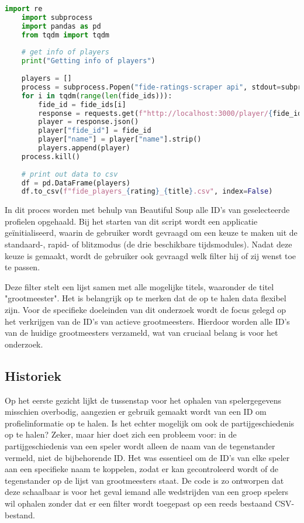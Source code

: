 \begin{lstlisting}[language=Python]
    import re
    import subprocess
    import pandas as pd
    from tqdm import tqdm
    
    # get info of players
    print("Getting info of players")
    
    players = []
    process = subprocess.Popen("fide-ratings-scraper api", stdout=subprocess.PIPE, stderr=subprocess.PIPE, shell=True)
    for i in tqdm(range(len(fide_ids))):
        fide_id = fide_ids[i]
        response = requests.get(f"http://localhost:3000/player/{fide_id}/info")
        player = response.json()
        player["fide_id"] = fide_id
        player["name"] = player["name"].strip()
        players.append(player)
    process.kill()
    
    # print out data to csv
    df = pd.DataFrame(players)
    df.to_csv(f"fide_players_{rating}_{title}.csv", index=False)
\end{lstlisting}

In dit proces worden met behulp van Beautiful Soup alle ID's van geselecteerde profielen opgehaald. Bij het starten van dit script wordt een applicatie geïnitialiseerd, waarin de gebruiker wordt gevraagd om een keuze te maken uit de standaard-, rapid- of blitzmodus (de drie beschikbare tijdsmodules). Nadat deze keuze is gemaakt, wordt de gebruiker ook gevraagd welk filter hij of zij wenst toe te passen.

Deze filter stelt een lijst samen met alle mogelijke titels, waaronder de titel "grootmeester". Het is belangrijk op te merken dat de op te halen data flexibel zijn. Voor de specifieke doeleinden van dit onderzoek wordt de focus gelegd op het verkrijgen van de ID's van actieve grootmeesters. Hierdoor worden alle ID's van de huidige grootmeesters verzameld, wat van cruciaal belang is voor het onderzoek.\autocite{NumFocus}

\subsection{Historiek}

Op het eerste gezicht lijkt de tussenstap voor het ophalen van spelergegevens misschien overbodig, aangezien er gebruik gemaakt wordt van een ID om profielinformatie op te halen. Is het echter mogelijk om ook de partijgeschiedenis op te halen? Zeker, maar hier doet zich een probleem voor: in de partijgeschiedenis van een speler wordt alleen de naam van de tegenstander vermeld, niet de bijbehorende ID. Het was essentieel om de ID's van elke speler aan een specifieke naam te koppelen, zodat er kan gecontroleerd wordt of de tegenstander op de lijst van grootmeesters staat. De code is zo ontworpen dat deze schaalbaar is voor het geval iemand alle wedstrijden van een groep spelers wil ophalen zonder dat er een filter wordt toegepast op een reeds bestaand CSV-bestand.

